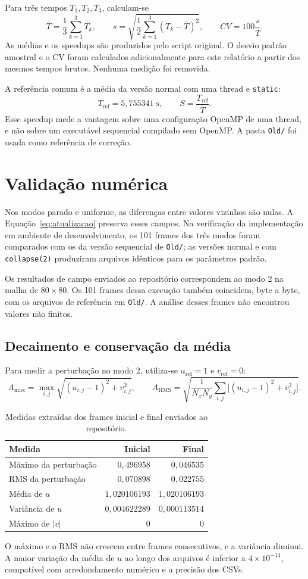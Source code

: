 \documentclass[12pt,a4paper]{article}
\begin{document}
Para três tempos $T_1,T_2,T_3$, calculam-se
\[
\overline{T}=\frac{1}{3}\sum_{k=1}^{3}T_k,\qquad
s=\sqrt{\frac{1}{2}\sum_{k=1}^{3}(T_k-\overline{T})^2},
\qquad
CV=100\frac{s}{\overline{T}}.
\]
As médias e os speedups são produzidos pelo script original. O desvio padrão amostral e o CV foram calculados adicionalmente para este relatório a partir dos mesmos tempos brutos. Nenhuma medição foi removida.

A referência comum é a média da versão normal com uma thread e \texttt{static}:
\[
T_{\mathrm{ref}}=5{,}755341\;\mathrm{s},\qquad
S=\frac{T_{\mathrm{ref}}}{\overline{T}}.
\]
Esse speedup mede a vantagem sobre uma configuração OpenMP de uma thread, e não sobre um executável sequencial compilado sem OpenMP. A pasta \texttt{Old/} foi usada como referência de correção.

\section{Validação numérica}
Nos modos parado e uniforme, as diferenças entre valores vizinhos são nulas. A Equação~\ref{eq:atualizacao} preserva esses campos. Na verificação da implementação em ambiente de desenvolvimento, os 101 frames dos três modos foram comparados com os da versão sequencial de \texttt{Old/}; as versões normal e com \texttt{collapse(2)} produziram arquivos idênticos para os parâmetros padrão.

Os resultados de campo enviados ao repositório correspondem ao modo 2 na malha de $80\times80$. Os 101 frames dessa execução também coincidem, byte a byte, com os arquivos de referência em \texttt{Old/}. A análise desses frames não encontrou valores não finitos.

\subsection{Decaimento e conservação da média}
Para medir a perturbação no modo 2, utiliza-se $u_{\mathrm{ref}}=1$ e $v_{\mathrm{ref}}=0$:
\[
A_{\max}=\max_{i,j}\sqrt{(u_{i,j}-1)^2+v_{i,j}^2},\qquad
A_{\mathrm{RMS}}=\sqrt{\frac{1}{N_xN_y}
\sum_{i,j}\big[(u_{i,j}-1)^2+v_{i,j}^2\big]}.
\]
\begin{table}[H]
\centering
\caption{Medidas extraídas dos frames inicial e final enviados ao repositório.}
\label{tab:validacao}
\small
\begin{tabular}{lrr}
\toprule
Medida & Inicial & Final\\
\midrule
Máximo da perturbação & $0{,}496958$ & $0{,}046535$\\
RMS da perturbação & $0{,}070898$ & $0{,}022755$\\
Média de $u$ & $1{,}020106193$ & $1{,}020106193$\\
Variância de $u$ & $0{,}004622289$ & $0{,}000113514$\\
Máximo de $|v|$ & $0$ & $0$\\
\bottomrule
\end{tabular}
\end{table}
O máximo e o RMS não crescem entre frames consecutivos, e a variância diminui. A maior variação da média de $u$ ao longo dos arquivos é inferior a $4\times10^{-14}$, compatível com arredondamento numérico e a precisão dos CSVs.
\end{document}

